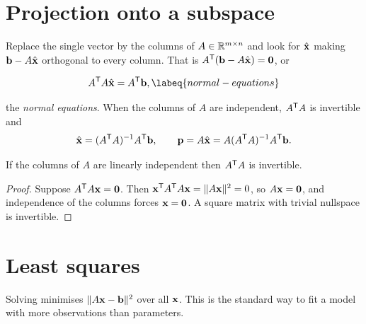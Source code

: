 \section{Projection onto a subspace}

Replace the single vector by the columns of \(A\in\mathbb{R}^{m\times n}\) and look for
\(\hat{\mathbf{x}}\) making \(\mathbf{b}-A\hat{\mathbf{x}}\) orthogonal to every
column. That is \(A^{\mathsf{T}}(\mathbf{b}-A\hat{\mathbf{x}})=\mathbf{0}\), or

\begin{equation}
	A\tp A\hat{\vect{x}}=A\tp\vect{b},
	\labeq{normal-equations}
\end{equation}

the \emph{normal equations}. When the columns of \(A\) are independent,
\(A^{\mathsf{T}} A\) is invertible and
\[
	\hat{\mathbf{x}}=(A^{\mathsf{T}} A)^{-1}A^{\mathsf{T}}\mathbf{b},
	\qquad
	\mathbf{p}=A\hat{\mathbf{x}}=A(A^{\mathsf{T}} A)^{-1}A^{\mathsf{T}}\mathbf{b}.
\]

\begin{proposition}
If the columns of \(A\) are linearly independent then \(A^{\mathsf{T}} A\) is invertible.
\end{proposition}

\begin{proof}
Suppose \(A^{\mathsf{T}} A\mathbf{x}=\mathbf{0}\). Then
\(\mathbf{x}^{\mathsf{T}} A^{\mathsf{T}} A\mathbf{x}=\lVert A\mathbf{x}\rVert^{2}=0\), so
\(A\mathbf{x}=\mathbf{0}\), and independence of the columns forces
\(\mathbf{x}=\mathbf{0}\). A square matrix with trivial nullspace is invertible.
\end{proof}


\section{Least squares}

Solving  minimises \(\lVert A\mathbf{x}-\mathbf{b}\rVert^{2}\)
over all \(\mathbf{x}\). This is the standard way to fit a model with more
observations than parameters.

